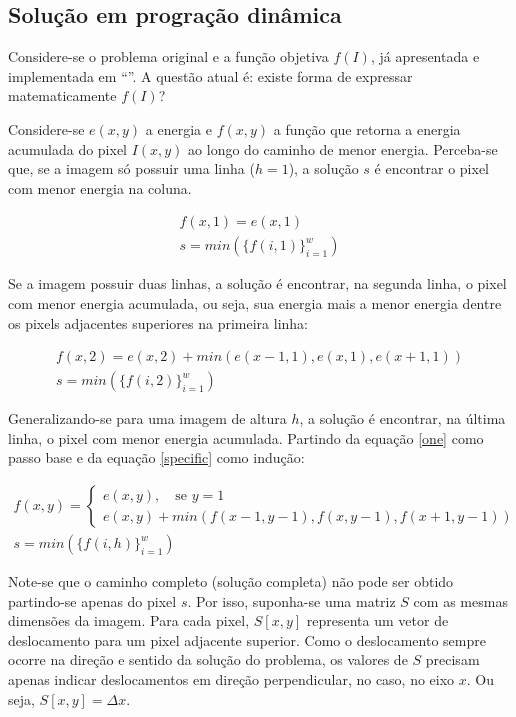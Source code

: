 
\subsection{Solução em progração dinâmica}
\label{sol:dp}

Considere-se o problema original e a função objetiva $f(I)$,
já apresentada e implementada em ``''. 
A questão atual é: 
existe forma de expressar matematicamente $f(I)$?

Considere-se $e(x,y)$ a energia e
$f(x,y)$ a função que retorna a energia acumulada do pixel $I(x,y)$
ao longo do caminho de menor energia.
Perceba-se que, se a imagem só possuir uma linha ($h = 1$), 
a solução $s$ é encontrar o pixel com menor energia na coluna.

\begin{gather}
f(x,1) = e(x,1) \nonumber\\
s = min(\{f(i,1)\}_{i=1}^w)
\label{one}
\end{gather}

Se a imagem possuir duas linhas, 
a solução é encontrar, na segunda linha, 
o pixel com menor energia acumulada,
ou seja, sua energia mais a menor energia dentre 
os pixels adjacentes superiores na primeira linha:

\begin{gather}
f(x,2) = e(x, 2) + min(e(x-1, 1), e(x, 1), e(x+1, 1)) \nonumber\\
s = min(\{f(i,2)\}_{i=1}^w) 
\label{specific}
\end{gather}

Generalizando-se para uma imagem de altura $h$, 
a solução é encontrar, na última linha, 
o pixel com menor energia acumulada.
Partindo da equação \ref{one} como passo base e 
da equação \ref{specific} como indução:

\begin{gather}
f(x,y)=\left\{ 
  \begin{array}{l}
    e(x,y),\quad \text{se $y = 1$}\\
    e(x,y)+min(f(x-1,y-1),f(x,y-1),f(x+1,y-1))
  \end{array} \right. \nonumber\\
s = min(\{f(i,h)\}_{i=1}^w)
\label{general-f}
\end{gather}

Note-se que o caminho completo (solução completa)
não pode ser obtido partindo-se apenas do pixel $s$.
Por isso, 
suponha-se uma matriz $S$ com as mesmas dimensões da imagem.
Para cada pixel, 
$S[x,y]$ representa um vetor de deslocamento 
para um pixel adjacente superior.
Como o deslocamento sempre ocorre 
na direção e sentido da solução do problema, 
os valores de $S$ precisam apenas indicar deslocamentos
em direção perpendicular, no caso, no eixo $x$.
Ou seja, $S[x,y] = \Delta{x}$.

